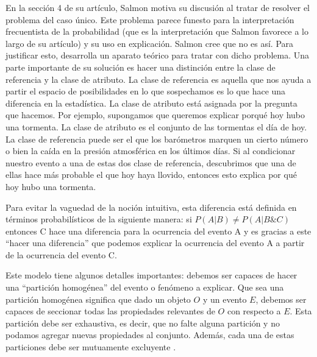 En la sección 4 de su artículo, Salmon motiva su discusión al tratar de resolver el problema del caso único. Este problema parece funesto para la interpretación frecuentista de la probabilidad (que es la interpretación que Salmon favorece a lo largo de su artículo) y su uso en explicación. Salmon cree que no es así. Para justificar esto, desarrolla un aparato teórico para tratar con dicho problema. Una parte importante de su solución es hacer una distinción entre la clase de referencia y la clase de atributo. La clase de referencia es aquella que nos ayuda a partir el espacio de posibilidades en lo que sospechamos es lo que hace una diferencia en la estadística. La clase de atributo está asignada por la pregunta que hacemos. Por ejemplo, supongamos que queremos explicar porqué hoy hubo una tormenta. La clase de atributo es el conjunto de las tormentas el día de hoy. La clase de referencia puede ser el que los barómetros marquen un cierto número o bien la caída en la presión atmosférica en los últimos días. Si al condicionar nuestro evento a una de estas dos clase de referencia, descubrimos que una de ellas hace más probable el que hoy haya llovido, entonces esto explica por qué hoy hubo una tormenta.

Para evitar la vaguedad de la noción intuitiva, esta diferencia está definida en términos probabilísticos de la siguiente manera: si $P(A|B) \neq P(A|B\&C)$ entonces C hace una diferencia para la ocurrencia del evento A y es gracias a este ``hacer una diferencia'' que podemos explicar la ocurrencia del evento A a partir de la ocurrencia del evento C.

Este modelo tiene algunos detalles importantes: debemos ser capaces de hacer una ``partición homogénea'' del evento o fenómeno a explicar. Que sea una partición homogénea significa que dado un objeto $O$ y un evento $E$, debemos ser capaces de seccionar todas las propiedades relevantes de $O$ con respecto a $E$. Esta partición debe ser exhaustiva, es decir, que no falte alguna partición y no podamos agregar nuevas propiedades al conjunto. Además, cada una de estas particiones debe ser mutuamente excluyente \cite{Woodward2019}.

